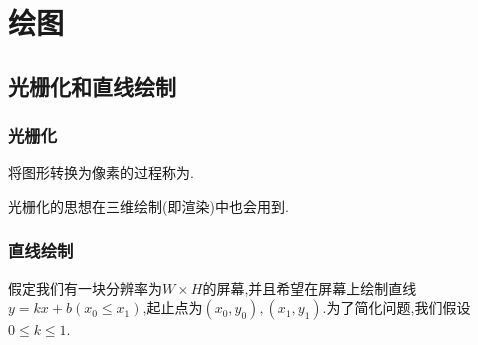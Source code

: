 \documentclass{ctexart}
\begin{document}
\section{绘图}
\subsection{光栅化和直线绘制}
\subsubsection{光栅化}
\begin{definition}[光栅化]
    将图形转换为像素的过程称为.
\end{definition}
光栅化的思想在三维绘制(即渲染)中也会用到.
\subsubsection{直线绘制}
假定我们有一块分辨率为$W\times H$的屏幕,并且希望在屏幕上绘制直线$y=kx+b(x_0\leqslant x_1)$,起止点为$\left(x_0,y_0\right),\left(x_1,y_1\right)$.为了简化问题,我们假设$0\leqslant k\leqslant 1$.
\end{document}
